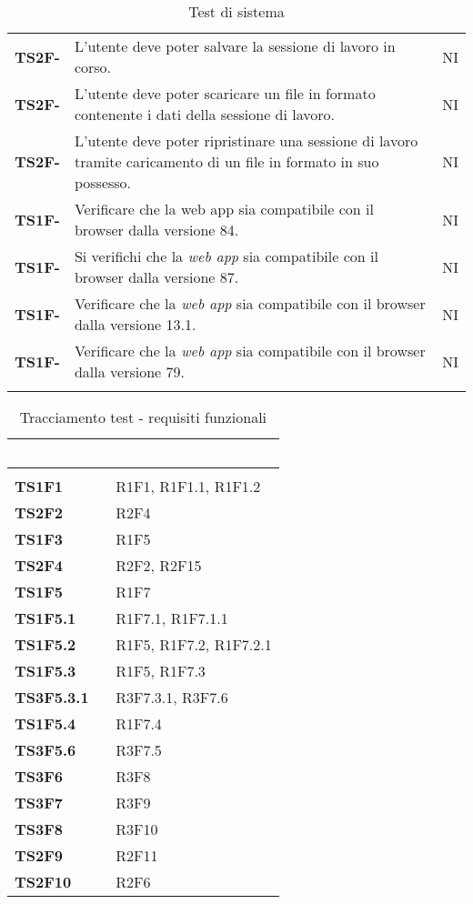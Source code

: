 {\begin{longtable}{ C{2cm} | C{12cm}| C{1.5cm} }
\textbf{TS2F-} & 
L'utente deve poter salvare la sessione di lavoro in corso. & 
NI\\

\textbf{TS2F-} & 
L'utente deve poter scaricare un file in formato  contenente i dati della sessione di lavoro. & 
NI\\

\textbf{TS2F-} & 
L'utente deve poter ripristinare una sessione di lavoro tramite caricamento di un file in formato  in suo possesso. & 
NI\\

\textbf{TS1F-} & 
Verificare che la web app sia compatibile con il browser  dalla versione 84. & 
NI\\

\textbf{TS1F-} & 
Si verifichi che la \textit{web app} sia compatibile con il browser  dalla versione 87. & 
NI\\

\textbf{TS1F-} & 
Verificare che la \textit{web app} sia compatibile con il browser  dalla versione 13.1. & 
NI\\

\textbf{TS1F-} & 
Verificare che la \textit{web app} sia compatibile con il browser  dalla versione 79. & 
NI\\
		   
\caption{Test di sistema}
\label{testSistema}
\end{longtable}

\renewcommand{\arraystretch}{1.5}
\renewcommand\extrarowheight{1.5pt}
\begin{longtable}{C{2.5cm} | C{10cm} } 
		\textcolor{white}{\textbf{Codice Test}} & 
		\textcolor{white}{\textbf{Codici Requisiti}} \\
		\endfirsthead
		 \\
	    \endfoot
	    \caption{Tracciamento test - requisiti funzionali}
	    \endlastfoot
		\hline
		\textbf{TS1F1} & R1F1, R1F1.1, R1F1.2 \\
		\textbf{TS2F2} & R2F4 \\
		\textbf{TS1F3} & R1F5 \\
		\textbf{TS2F4} & R2F2, R2F15 \\
		\textbf{TS1F5} &  R1F7 \\
		\textbf{TS1F5.1} & R1F7.1, R1F7.1.1 \\
		\textbf{TS1F5.2} & R1F5, R1F7.2, R1F7.2.1 \\
		\textbf{TS1F5.3} &  R1F5, R1F7.3\\
		\textbf{TS3F5.3.1} & R3F7.3.1, R3F7.6 \\
		\textbf{TS1F5.4} & R1F7.4 \\
		\textbf{TS3F5.6} & R3F7.5 \\
		\textbf{TS3F6} & R3F8 \\
		\textbf{TS3F7} & R3F9 \\
		\textbf{TS3F8} & R3F10 \\
		\textbf{TS2F9} & R2F11 \\
		\textbf{TS2F10} & R2F6 
\end{longtable}
}